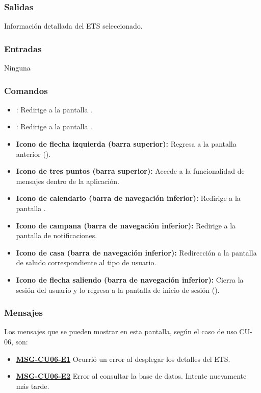 \subsubsection{Salidas}
Información detallada del ETS seleccionado.

\subsubsection{Entradas}
Ninguna

\subsubsection{Comandos}
\begin{itemize}
	\item {}: Redirige a la pantalla .
	\item {}: Redirige a la pantalla .
	\item \textbf{Icono de flecha izquierda (barra superior):} Regresa a la pantalla anterior ().
	\item \textbf{Icono de tres puntos (barra superior):} Accede a la funcionalidad de mensajes dentro de la aplicación.
	\item \textbf{Icono de calendario (barra de navegación inferior):} Redirige a la pantalla .
	\item \textbf{Icono de campana (barra de navegación inferior):} Redirige a la pantalla de notificaciones.
	\item \textbf{Icono de casa (barra de navegación inferior):} Redirección a la pantalla de saludo correspondiente al tipo de usuario.
	\item \textbf{Icono de flecha saliendo (barra de navegación inferior):} Cierra la sesión del usuario y lo regresa a la pantalla de inicio de sesión ().
\end{itemize}

\subsubsection{Mensajes}
Los mensajes que se pueden mostrar en esta pantalla, según el caso de uso CU-06, son:
\begin{itemize}
	\item \textbf{\hyperref[msg:CU06-E1]{MSG-CU06-E1}} Ocurrió un error al desplegar los detalles del ETS.
	\item \textbf{\hyperref[msg:CU06-E2]{MSG-CU06-E2}} Error al consultar la base de datos. Intente nuevamente más tarde.
\end{itemize}

